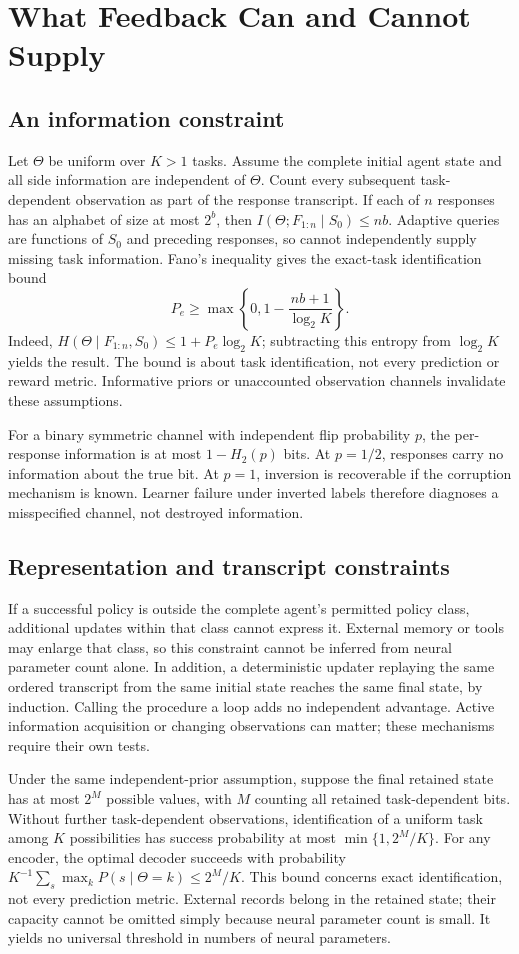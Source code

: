 \documentclass[11pt]{article}
\begin{document}
\section{What Feedback Can and Cannot Supply}
\subsection{An information constraint}
Let $\Theta$ be uniform over $K>1$ tasks. Assume the complete initial agent
state and all side information are independent of $\Theta$. Count every
subsequent task-dependent observation as part of the response transcript.
If each of $n$ responses has an alphabet of size at most $2^b$, then
$I(\Theta;F_{1:n}\mid S_0)\leq nb$. Adaptive queries are functions of
$S_0$ and preceding responses, so cannot independently supply missing task
information. Fano's inequality gives the exact-task identification bound
\[
 P_e\geq \max\left\{0,1-\frac{nb+1}{\log_2 K}\right\}.
\]
Indeed, $H(\Theta\mid F_{1:n},S_0)\leq 1+P_e\log_2 K$; subtracting
this entropy from $\log_2 K$ yields the result. The bound is about task
identification, not every prediction or reward metric. Informative priors or
unaccounted observation channels invalidate these assumptions.

For a binary symmetric channel with independent flip probability $p$, the
per-response information is at most $1-H_2(p)$ bits. At $p=1/2$, responses
carry no information about the true bit. At $p=1$, inversion is recoverable
if the corruption mechanism is known. Learner failure under inverted labels
therefore diagnoses a misspecified channel, not destroyed information.

\subsection{Representation and transcript constraints}
If a successful policy is outside the complete agent's permitted policy class,
additional updates within that class cannot express it. External memory or
tools may enlarge that class, so this constraint cannot be inferred from
neural parameter count alone. In addition, a deterministic updater replaying
the same ordered transcript from the same initial state reaches the same
final state, by induction. Calling the procedure a loop adds no independent
advantage. Active information acquisition or changing observations can matter;
these mechanisms require their own tests.

Under the same independent-prior assumption, suppose the final retained state has at
most $2^M$ possible values, with $M$ counting all retained task-dependent bits.
Without further task-dependent observations, identification of a uniform task
among $K$ possibilities has success probability at most
$\min\{1,2^M/K\}$. For any encoder, the optimal decoder succeeds with probability
$K^{-1}\sum_s\max_k P(s\mid\Theta=k)\leq 2^M/K$.
This bound concerns exact identification, not every prediction metric. External
records belong in the retained state; their capacity cannot be omitted simply
because neural parameter count is small. It yields no universal threshold in
numbers of neural parameters.
\end{document}
